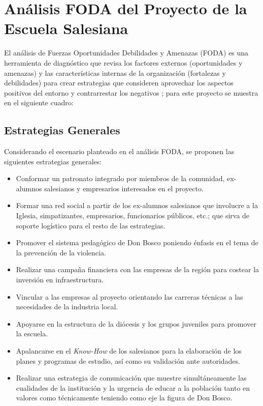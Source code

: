 

\clearpage
\section{Análisis FODA del Proyecto de la Escuela Salesiana}
\label{sec:Neg:Foda}

El análisis de Fuerzas Oportunidades Debilidades y Amenazas (FODA) es una herramienta de diagnóstico que revisa los factores externos (oportunidades y amenazas) y las características internas de la organización (fortalezas y debilidades) para crear estrategias que consideren aprovechar los aspectos positivos del entorno y contrarrestar los negativos \citep{DAVID2003}; para este proyecto se muestra en el siguiente cuadro:



\subsection{Estrategias Generales}

Considerando el escenario planteado en el análisis FODA, se proponen las siguientes estrategias generales:

\begin{itemize}
	\item Conformar un patronato integrado por miembros de la comunidad, ex-alumnos salesianos y empresarios interesados en el proyecto.
	\item Formar una red social a partir de los ex-alumnos salesianos que involucre a la Iglesia, simpatizantes, empresarios, funcionarios públicos, etc.; que sirva de soporte logístico para el resto de las estrategias.
	\item Promover el sistema pedagógico de Don Bosco poniendo énfasis en el tema de la prevención de la violencia.
	\item Realizar una campaña financiera con las empresas de la región para costear la inversión en infraestructura.
	\item Vincular a las empresas al proyecto orientando las carreras técnicas a las necesidades de la industria local.
	\item Apoyarse en la estructura de la diócesis y los grupos juveniles para promover la escuela.
	\item Apalancarse en el \emph{Know-How} de los salesianos para la elaboración de los planes y programas de estudio, así como su validación ante autoridades.
	\item Realizar una estrategia de comunicación que muestre simultáneamente las cualidades de la institución y la urgencia de educar a la población tanto en valores como técnicamente teniendo como eje la figura de Don Bosco.
\end{itemize}

